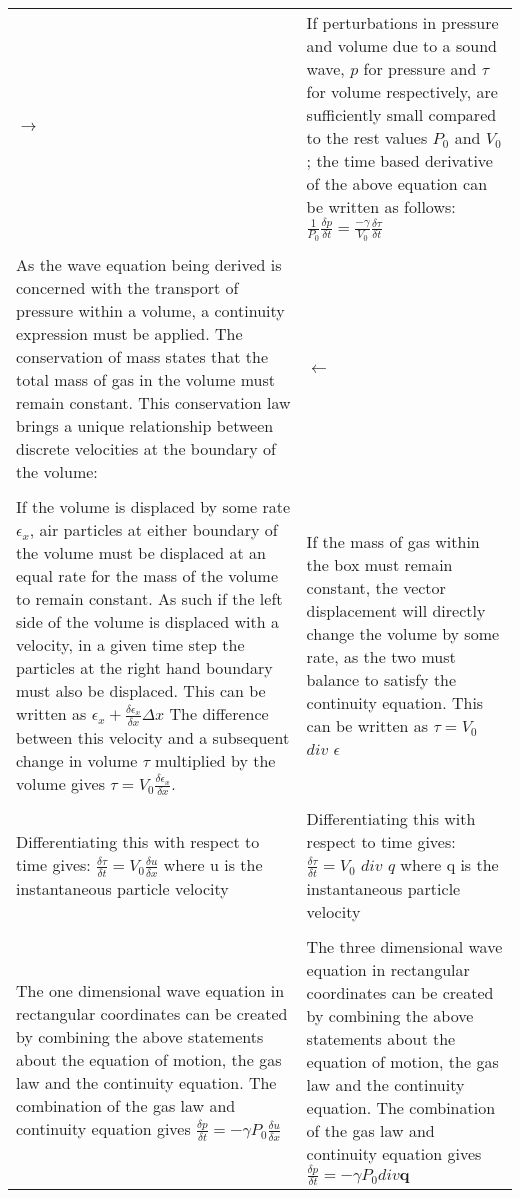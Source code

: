 \begin{center}
\begin{longtable}{|p{}|p{}|}
$\rightarrow$ & If perturbations in pressure and volume due to a sound wave, $p$ for pressure and $\tau$ for volume respectively, are sufficiently small compared to the rest values $P_0$ and $V_0$; the time based derivative of the above equation can be written as follows: $\frac{1}{P_0} \frac{\delta p}{\delta t} = \frac{-\gamma}{V_0} \frac{\delta \tau}{\delta t}$  \\
\\
As the wave equation being derived is concerned with the transport of pressure within a volume, a continuity expression must be applied. The conservation of mass states that the total mass of gas in the volume must remain constant. This conservation law brings a unique relationship between discrete velocities at the boundary of the volume: & $\leftarrow$\\
\\
If the volume is displaced by some rate $\epsilon_x$, air particles at either boundary of the volume must be displaced at an equal rate for the mass of the volume to remain constant. As such if the left side of the volume is displaced with a velocity, in a given time step the particles at the right hand boundary must also be displaced. This can be written as $\epsilon_x + \frac{\delta \epsilon_x}{\delta x} \Delta x$ The difference between this velocity and a subsequent change in volume $\tau$ multiplied by the volume gives $\tau = V_0\frac{\delta \epsilon_x}{\delta x}.$ & If the mass of gas within the box must remain constant, the vector displacement will directly change the volume by some rate, as the two must balance to satisfy the continuity equation. This can be written as $\tau = V_0$ $div$ $\epsilon $ \\
\\
Differentiating this with respect to time gives: $\frac{\delta \tau}{\delta t} = V_0\frac{\delta u}{\delta x}$ where u is the instantaneous particle velocity & Differentiating this with respect to time gives: $\frac{\delta \tau}{\delta t} = V_0$ $div$ $q$ where q is the instantaneous particle velocity\\
\\
The one dimensional wave equation in rectangular coordinates can be created by combining the above statements about the equation of motion, the gas law and the continuity equation. The combination of the gas law and continuity equation gives $\frac{\delta p}{\delta t} = -\gamma P_0\frac{\delta u}{\delta x}$ & The three dimensional wave equation in rectangular coordinates can be created by combining the above statements about the equation of motion, the gas law and the continuity equation. The combination of the gas law and continuity equation gives $\frac{\delta p}{\delta t} = -\gamma P_0 div \textbf{q}$\\

\end{longtable}
\end{center}
